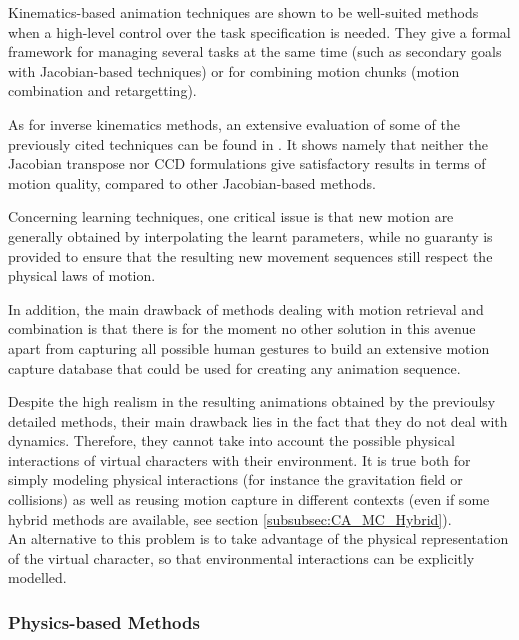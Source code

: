 				\label{subsubsubsec:CA_MC_Kinematics_Conclusion}

Kinematics-based animation techniques are shown to be well-suited methods when a high-level control over the task specification is needed. They give a formal framework for managing several tasks at the same time (such as secondary goals with Jacobian-based techniques) or for combining motion chunks (motion combination and retargetting).

As for inverse kinematics methods, an extensive evaluation of some of the previously cited techniques can be found in . It shows namely that neither the Jacobian transpose nor CCD formulations give satisfactory results in terms of motion quality, compared to other Jacobian-based methods.

Concerning learning techniques, one critical issue is that new motion are generally obtained by interpolating the learnt parameters, while no guaranty is provided to ensure that the resulting new movement sequences still respect the physical laws of motion.

In addition, the main drawback of methods dealing with motion retrieval and combination is that there is for the moment no other solution in this avenue apart from capturing all possible human gestures to build an extensive motion capture database that could be used for creating any animation sequence.

Despite the high realism in the resulting animations obtained by the previoulsy detailed methods, their main drawback lies in the fact that they do not deal with dynamics. Therefore, they cannot take into account the possible physical interactions of virtual characters with their environment. It is true both for simply modeling physical interactions (for instance the gravitation field or collisions) as well as reusing motion capture in different contexts (even if some hybrid methods are available, see section \ref{subsubsec:CA_MC_Hybrid}).\\

An alternative to this problem is to take advantage of the physical representation of the virtual character, so that environmental interactions can be explicitly modelled.


			\subsubsection{Physics-based Methods}
			\label{subsubsec:CA_MC_Physics}

